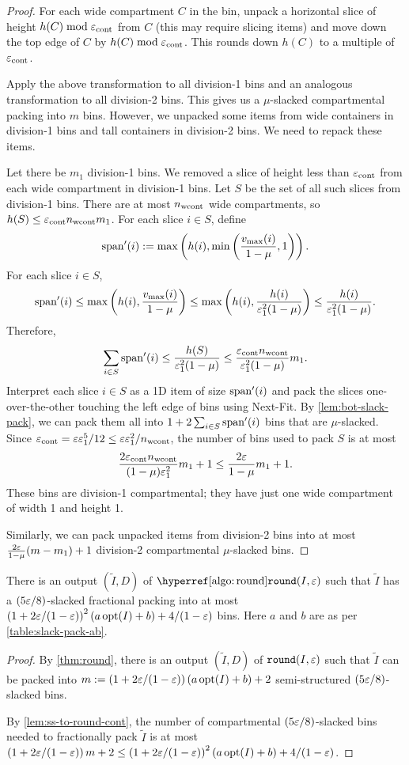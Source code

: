 \begin{proof}
For each wide compartment $C$ in the bin, unpack a horizontal slice of height
$h(C) \bmod \varepsilon_{\mathrm{cont}}$ from $C$ (this may require slicing items)
and move down the top edge of $C$ by $h(C) \bmod \varepsilon_{\mathrm{cont}}$.
This rounds down $h(C)$ to a multiple of $\varepsilon_{\mathrm{cont}}$.

Apply the above transformation to all division-1 bins
and an analogous transformation to all division-2 bins.
This gives us a $\mu$-slacked compartmental packing into $m$ bins.
However, we unpacked some items from wide containers in division-1 bins
and tall containers in division-2 bins. We need to repack these items.

Let there be $m_1$ division-1 bins. We removed a slice of height less than $\varepsilon_{\mathrm{cont}}$
from each wide compartment in division-1 bins.
Let $S$ be the set of all such slices from division-1 bins.
There are at most $n_{\mathrm{wcont}}$ wide compartments, so $h(S) \le \varepsilon_{\mathrm{cont}}n_{\mathrm{wcont}} m_1$.
For each slice $i \in S$, define
\[ \operatorname{span}'(i) := \max\left(h(i), \min\left(\frac{v_{\max}(i)}{1-\mu}, 1\right)\right). \]
For each slice $i \in S$,
\[ \operatorname{span}'(i) \le \max\left(h(i), \frac{v_{\max}(i)}{1-\mu}\right)
\le \max\left(h(i), \frac{h(i)}{\varepsilon_1^2(1-\mu)}\right)
\le \frac{h(i)}{\varepsilon_1^2(1-\mu)}. \]
Therefore,
\[ \sum_{i \in S} \operatorname{span}'(i) \le \frac{h(S)}{\varepsilon_1^2(1-\mu)}
\le \frac{\varepsilon_{\mathrm{cont}}n_{\mathrm{wcont}}}{\varepsilon_1^2(1-\mu)} m_1. \]
Interpret each slice $i \in S$ as a 1D item of size $\operatorname{span}'(i)$ and pack the slices
one-over-the-other touching the left edge of bins using Next-Fit.
By \cref{lem:bot-slack-pack}, we can pack them all into
$1 + 2\sum_{i \in S}\operatorname{span}'(i)$ bins that are $\mu$-slacked.
Since $\varepsilon_{\mathrm{cont}} = \varepsilon\varepsilon_1^5/12 \le \varepsilon\varepsilon_1^2/n_{\mathrm{wcont}}$,
the number of bins used to pack $S$ is at most
\[ \frac{2\varepsilon_{\mathrm{cont}}n_{\mathrm{wcont}}}{(1-\mu)\varepsilon_1^2} m_1 + 1
\le \frac{2\varepsilon}{1-\mu} m_1 + 1. \]
These bins are division-1 compartmental;
they have just one wide compartment of width 1 and height 1.

Similarly, we can pack unpacked items from division-2 bins
into at most $\frac{2\varepsilon}{1-\mu} (m-m_1) + 1$ division-2 compartmental $\mu$-slacked bins.
\end{proof}

\begin{theorem}
\label{thm:struct-theorem}
There is an output $(\widetilde{I}, D)$ of $\roundHyp(I, \eps)$ such that $\widetilde{I}$
has a \compartmentalHyp{} $(5\varepsilon/8)$-slacked fractional packing into at most
$\left( 1 + 2\varepsilon/(1-\varepsilon) \right)^2 (a\operatorname{opt}(I) + b) + 4/(1-\varepsilon)$
bins. Here $a$ and $b$ are as per \cref{table:slack-pack-ab}.
\end{theorem}
\begin{proof}
By \cref{thm:round}, there is an output $(\widetilde{I}, D)$ of $\operatorname{\mathtt{round}}(I, \varepsilon)$
such that $\widetilde{I}$ can be packed into
$m := \left( 1 + 2\varepsilon/(1-\varepsilon) \right)(a\operatorname{opt}(I) + b) + 2$
semi-structured $(5\varepsilon/8)$-slacked bins.

By \cref{lem:ss-to-round-cont}, the number of compartmental $(5\varepsilon/8)$-slacked
bins needed to fractionally pack $\widetilde{I}$ is at most
$\left( 1 + 2\varepsilon/(1-\varepsilon) \right) m + 2
\le \left( 1 + 2\varepsilon/(1-\varepsilon) \right)^2 (a\operatorname{opt}(I) + b) + 4/(1-\varepsilon)$.
\end{proof}

